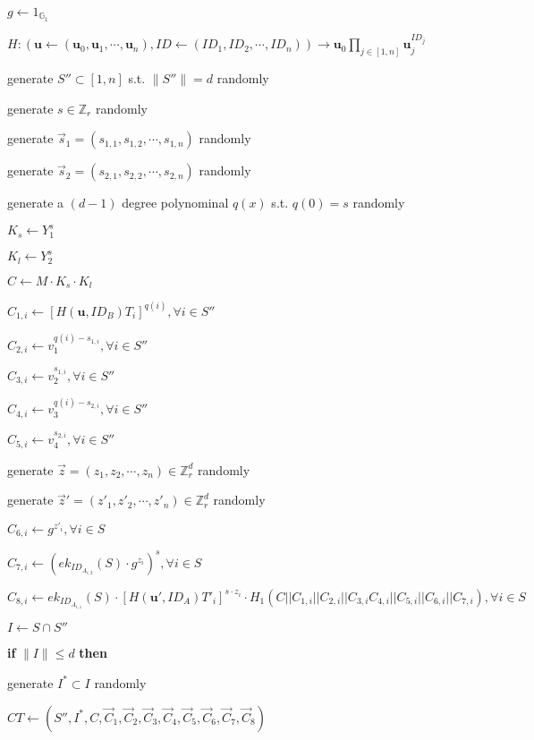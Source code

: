 \documentclass[a4paper]{article}
\begin{document}
$g \gets 1_{\mathbb{G}_1}$

$H: (\bm{u} \gets (\bm{u}_0, \bm{u}_1, \cdots, \bm{u}_n), \textit{ID} \gets (\textit{ID}_1, \textit{ID}_2, \cdots, \textit{ID}_n)) \rightarrow \bm{u}_0\prod\limits_{j \in [1, n]} \bm{u}_j^{\textit{ID}_j}$

generate $S'' \subset [1, n]$ s.t. $\|S''\| = d$ randomly

generate $s \in \mathbb{Z}_r$ randomly

generate $\vec{s}_1 = (s_{1, 1}, s_{1, 2}, \cdots, s_{1, n})$ randomly

generate $\vec{s}_2 = (s_{2, 1}, s_{2, 2}, \cdots, s_{2, n})$ randomly

generate a $(d - 1)$ degree polynominal $q(x)$ s.t. $q(0) = s$ randomly

$K_s \gets Y_1^s$

$K_l \gets Y_2^s$

$C \gets M \cdot K_s \cdot K_l$

$C_{1, i} \gets [H(\bm{u}, \textit{ID}_B) T_i]^{q(i)}, \forall i \in S''$

$C_{2, i} \gets v_1^{q(i) - s_{1, i}}, \forall i \in S''$

$C_{3, i} \gets v_2^{s_{1, i}}, \forall i \in S''$

$C_{4, i} \gets v_3^{q(i) - s_{2, i}}, \forall i \in S''$

$C_{5, i} \gets v_4^{s_{2, i}}, \forall i \in S''$

generate $\vec{z} = (z_1, z_2, \cdots, z_n) \in \mathbb{Z}_r^d$ randomly

generate $\vec{z}' = (z'_1, z'_2, \cdots, z'_n) \in \mathbb{Z}_r^d$ randomly

$C_{6, i} \gets g^{z'_i}, \forall i \in S$

$C_{7, i} \gets (\textit{ek}_{\textit{ID}_{A_{i, 2}}}(S) \cdot g^{z_i})^s, \forall i \in S$

$C_{8, i} \gets \textit{ek}_{\textit{ID}_{A_{i, 1}}}(S) \cdot [H(\bm{u}', \textit{ID}_A) T'_i]^{s \cdot z_i} \cdot H_1(
C || C_{1, i} || C_{2, i} || C_{3, i}
C_{4, i} || C_{5, i} || C_{6, i} || C_{7, i}
), \forall i \in S$

$I \gets S \cap S''$

\textbf{if} $\|I\| \leqslant d$ \textbf{then}

	\quad generate $I^* \subset I$ randomly

$\textit{CT} \gets (S'', I^*, C, \vec{C}_1, \vec{C}_2, \vec{C}_3, \vec{C}_4, \vec{C}_5, \vec{C}_6, \vec{C}_7, \vec{C}_8)$
\end{document}

